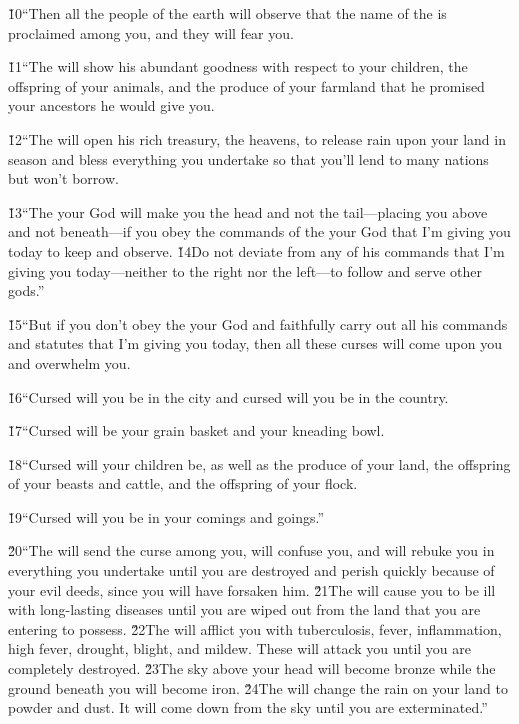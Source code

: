 \v{10}``Then all the people of the earth will observe that the name of the  is proclaimed among you, and they will fear you.

\v{11}``The  will show his abundant goodness with respect to your children, the offspring of your animals, and the produce of your farmland that he promised your ancestors he would give you.

\v{12}``The  will open his rich treasury, the heavens, to release rain upon your land in season and bless everything you undertake so that you'll lend to many nations but won't borrow.

\v{13}``The  your God will make you the head and not the tail---placing you above and not beneath---if you obey the commands of the  your God that I'm giving you today to keep and observe. \v{14}Do not deviate from any of his commands that I'm giving you today---neither to the right nor the left---to follow and serve other gods.''

\v{15}``But if you don't obey the  your God and faithfully carry out all his commands and statutes that I'm giving you today, then all these curses will come upon you and overwhelm you.

\v{16}``Cursed will you be in the city and cursed will you be in the country.

\v{17}``Cursed will be your grain basket and your kneading bowl.

\v{18}``Cursed will your children be, as well as the produce of your land, the offspring of your beasts and cattle, and the offspring of your flock.

\v{19}``Cursed will you be in your comings and goings.''

\v{20}``The  will send the curse among you, will confuse you, and will rebuke you in everything you undertake until you are destroyed and perish quickly because of your evil deeds, since you will have forsaken him. \v{21}The  will cause you to be ill with long-lasting diseases until you are wiped out from the land that you are entering to possess. \v{22}The  will afflict you with tuberculosis, fever, inflammation, high fever, drought, blight, and mildew. These will attack you until you are completely destroyed. \v{23}The sky above your head will become bronze while the ground beneath you will become iron. \v{24}The  will change the rain on your land to powder and dust. It will come down from the sky until you are exterminated.''

